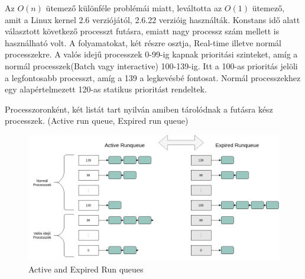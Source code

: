 Az $O(n)$ ütemező különféle problémái miatt, leváltotta az $O(1)$ ütemező, amit a Linux kernel 2.6 verziójától, 2.6.22 verzióig használták. 
Konstans idő alatt választott következő processzt futásra, emiatt nagy processz szám mellett is használható volt.
A folyamatokat, két részre osztja, Real-time illetve normál processzekre. A valós idejű processzek 0-99-ig kapnak prioritási szinteket, amíg a normál processzek(Batch vagy interactive) 100-139-ig. Itt a 100-as prioritás jelöli a legfontosabb processzt, amíg a 139 a legkevésbé fontosat. Normál processzekhez egy alapértelmezett 120-as statikus prioritást rendeltek. 

Processzoronként, két listát tart nyilván amiben tárolódnak a futásra kész processzek. (Active run queue, Expired run queue)

\begin{figure}[h]
\centering
\includegraphics[width=\textwidth]{images/activeExpiredRunqueue.png}
\caption{Active and Expired Run queues}
\label{fig:Active and expired runqueues}
\end{figure}


